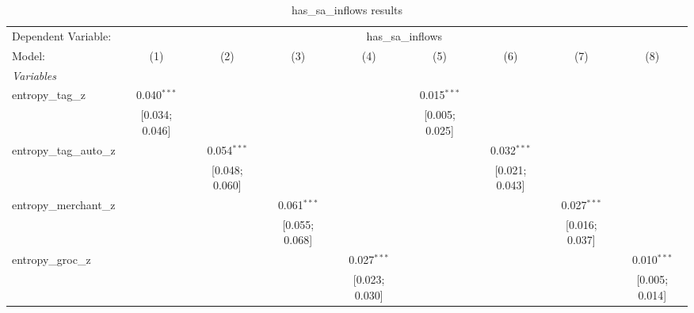 
\begin{table}[htbp]
   \centering
   \tiny
   \begin{threeparttable}[b]
      \caption{\label{tab:reg_has_sa_inflows_full} has\_sa\_inflows results}
      \begin{tabular}{lcccccccc}
         \tabularnewline \midrule \midrule
         Dependent Variable: & \multicolumn{8}{c}{has\_sa\_inflows}\\
         Model:                   & (1)                            & (2)              & (3)              & (4)              & (5)             & (6)             & (7)             & (8)\\  
         \midrule
         \emph{Variables}\\
         entropy\_tag\_z          & 0.040$^{***}$                  &                  &                  &                  & 0.015$^{***}$   &                 &                 &   \\   
                                  & [0.034; 0.046]                 &                  &                  &                  & [0.005; 0.025]  &                 &                 &   \\   
         entropy\_tag\_auto\_z    &                                & 0.054$^{***}$    &                  &                  &                 & 0.032$^{***}$   &                 &   \\   
                                  &                                & [0.048; 0.060]   &                  &                  &                 & [0.021; 0.043]  &                 &   \\   
         entropy\_merchant\_z     &                                &                  & 0.061$^{***}$    &                  &                 &                 & 0.027$^{***}$   &   \\   
                                  &                                &                  & [0.055; 0.068]   &                  &                 &                 & [0.016; 0.037]  &   \\   
         entropy\_groc\_z         &                                &                  &                  & 0.027$^{***}$    &                 &                 &                 & 0.010$^{***}$\\   
                                  &                                &                  &                  & [0.023; 0.030]   &                 &                 &                 & [0.005; 0.014]\\   

\end{tabular}
\end{threeparttable}
\end{table}
